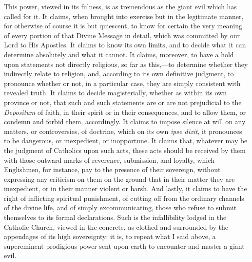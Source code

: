 This power, viewed in its fulness, is as tremendous as the giant evil
which has called for it. It claims, when brought into exercise but in the legitimate manner, for
otherwise of course it is but quiescent, to know for certain the very
meaning of every portion of that Divine Message in detail,
which was committed by our Lord to His Apostles. It claims to know its
own limits, and to decide what it can determine absolutely and
what it cannot. It claims, moreover, to have a hold upon statements not
directly religious, so far as this,—to determine whether they
indirectly relate to religion, and, according to its own definitive
judgment, to pronounce whether or not, in a particular case, they are simply consistent with revealed truth. It claims to decide
magisterially, whether as within its own province or not, that such and such
statements are or are not prejudicial to the \emph{Depositum}
of faith, in their spirit or in their consequences, and to
allow them, or condemn and forbid them, accordingly. It claims to impose
silence at will on any matters, or controversies, of doctrine, which on
its own \emph{ipse dixit}, it pronounces to be dangerous, or
inexpedient, or inopportune. It claims that, whatever may be the
judgment of Catholics upon such acts, these acts should be received by
them with those outward marks of reverence, submission, and loyalty,
which Englishmen, for instance, pay to the presence of their sovereign,
without expressing any criticism on them on the ground that in their
matter they are inexpedient, or in their manner violent or
harsh. And lastly, it claims to have the right of inflicting spiritual
punishment, of cutting off from the ordinary channels of the divine
life, and of simply excommunicating, those who refuse to submit
themselves to its formal declarations. Such is the infallibility lodged
in the Catholic Church, viewed in the concrete, as clothed and
surrounded by the appendages of its high sovereignty: it is, to repeat
what I said above, a supereminent prodigious power sent upon earth to
encounter and master a giant evil.

